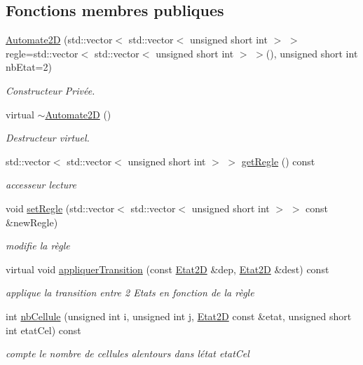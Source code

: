 \subsection*{Fonctions membres publiques}
\begin{DoxyCompactItemize}
\item 
\hyperlink{class_automate2_d_ae00c4fae1c73cbac83424d576cfbd23d}{Automate2D} (std\+::vector$<$ std\+::vector$<$ unsigned short int $>$ $>$ regle=std\+::vector$<$ std\+::vector$<$ unsigned short int $>$ $>$(), unsigned short int nb\+Etat=2)
\begin{DoxyCompactList}\small\item\em Constructeur Privée. \end{DoxyCompactList}\item 
virtual \hyperlink{class_automate2_d_a20624efccdb4ec55afe6259f51ce3dd2}{$\sim$\+Automate2D} ()
\begin{DoxyCompactList}\small\item\em Destructeur virtuel. \end{DoxyCompactList}\item 
std\+::vector$<$ std\+::vector$<$ unsigned short int $>$ $>$ \hyperlink{class_automate2_d_a0140faf046124a3d6c1792ca8493f60b}{get\+Regle} () const 
\begin{DoxyCompactList}\small\item\em accesseur lecture \end{DoxyCompactList}\item 
void \hyperlink{class_automate2_d_a250f624adbe858ecbb17784730845248}{set\+Regle} (std\+::vector$<$ std\+::vector$<$ unsigned short int $>$ $>$ const \&new\+Regle)
\begin{DoxyCompactList}\small\item\em modifie la règle \end{DoxyCompactList}\item 
virtual void \hyperlink{class_automate2_d_a2cbea145a6e7eff58528bcab31316365}{appliquer\+Transition} (const \hyperlink{class_etat2_d}{Etat2D} \&dep, \hyperlink{class_etat2_d}{Etat2D} \&dest) const 
\begin{DoxyCompactList}\small\item\em applique la transition entre 2 Etats en fonction de la règle \end{DoxyCompactList}\item 
int \hyperlink{class_automate2_d_a067188a9e1b3afc554fc195e20cd60e8}{nb\+Cellule} (unsigned int i, unsigned int j, \hyperlink{class_etat2_d}{Etat2D} const \&etat, unsigned short int etat\+Cel) const 
\begin{DoxyCompactList}\small\item\em compte le nombre de cellules alentours dans l\textquotesingle{}état etat\+Cel \end{DoxyCompactList}\end{DoxyCompactItemize}
